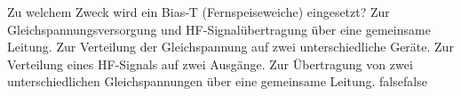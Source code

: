     {Zu welchem Zweck wird ein Bias-T (Fernspeiseweiche) eingesetzt?}
    {Zur Gleichspannungsversorgung und HF-Signalübertragung über eine gemeinsame Leitung.}
    {Zur Verteilung der Gleichspannung auf zwei unterschiedliche Geräte.}
    {Zur Verteilung eines HF-Signals auf zwei Ausgänge.}
    {Zur Übertragung von zwei unterschiedlichen Gleichspannungen über eine gemeinsame Leitung.}
    {false}{false}